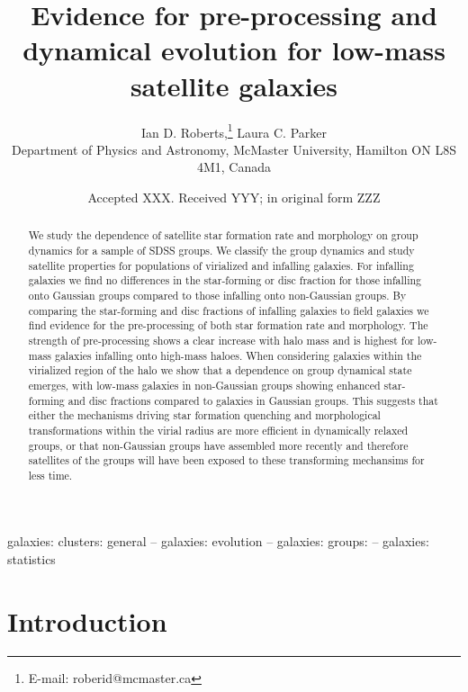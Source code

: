 \documentclass[a4paper,fleqn,usenatbib]{mnras}
\title[Pre-processing \& dynamical evolution]{Evidence for
  pre-processing and dynamical evolution for low-mass satellite galaxies}
\author[I.D. Roberts \& L.C. Parker]{
Ian D. Roberts,\thanks{E-mail: roberid@mcmaster.ca}
Laura C. Parker
\\
Department of Physics and Astronomy, McMaster University, Hamilton ON
L8S 4M1, Canada
}
\date{Accepted XXX. Received YYY; in original form ZZZ}
\begin{document}
\label{firstpage}
\pagerange{\pageref{firstpage}--\pageref{lastpage}}
\maketitle

\begin{abstract}
We study the dependence of satellite star formation rate and
morphology on group dynamics for a sample of SDSS groups.  We classify
the group dynamics and study satellite properties for populations of
virialized and infalling galaxies.  For infalling galaxies
we find no differences in the star-forming or
disc fraction for those infalling onto Gaussian groups compared to
those infalling onto non-Gaussian groups.  By comparing the
star-forming and disc fractions of infalling galaxies to field
galaxies we find evidence for the pre-processing of both star
formation rate and morphology.  The strength of pre-processing shows a
clear increase with halo mass and is highest for low-mass galaxies
infalling onto high-mass haloes.  When considering galaxies within the
virialized region of the halo we show that a dependence on group
dynamical state emerges, with low-mass galaxies in non-Gaussian groups showing
enhanced star-forming and disc fractions compared to galaxies in
Gaussian groups.  This suggests that either the
mechanisms driving star formation quenching and morphological
transformations within the virial radius are more efficient in
dynamically relaxed groups, or that non-Gaussian groups have assembled more
recently and therefore satellites of the groups will have been exposed
to these transforming mechansims for less time.
\end{abstract}

\begin{keywords}
galaxies: clusters: general -- galaxies: evolution -- galaxies:
groups: -- galaxies: statistics
\end{keywords}



\section{Introduction}
\label{sec:introduction}
\end{document}
